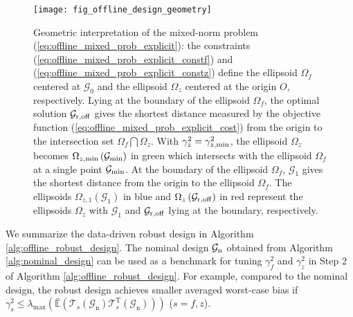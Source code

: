 \documentclass[twocolumn]{autart}
\begin{document}
\begin{figure}[!ht]
\begin{center}
\texttt{[image: fig\_offline\_design\_geometry]}
\caption{Geometric interpretation of the mixed-norm problem (\ref{eq:offline_mixed_prob_explicit}): the constraints (\ref{eq:offline_mixed_prob_explicit_constf}) and (\ref{eq:offline_mixed_prob_explicit_constz}) define the ellipsoid $\Omega_f$ centered at $\mathcal{G}_0$ and the ellipsoid $\Omega_z$ centered at the origin $O$, respectively.
Lying at the boundary of the ellipsoid $\Omega_f$, the optimal solution
$\mathcal{G}_{\rm{r,off}}$ gives the shortest distance measured by the objective function (\ref{eq:offline_mixed_prob_explicit_cost}) from the origin to the intersection set $\Omega_f \bigcap \Omega_z$.
With $\gamma_z^2 = \gamma_{z,\rm{min}}^2$, the ellipsoid $\Omega_z$ becomes $\Omega_{z,\rm{min}} \left( \mathcal{G}_{\rm{min}} \right)$ in green which intersects with the ellipsoid $\Omega_f$ at a single point $\mathcal{G}_{\rm{min}}$.
At the boundary of the ellipsoid $\Omega_f$,
$\mathcal{G}_1$ gives the shortest distance from the origin to the ellipsoid $\Omega_f$.
The ellipsoids $\Omega_{z,1} \left( \mathcal{G}_1 \right)$ in blue and $\Omega_{z} \left( \mathcal{G}_{\rm{r,off}} \right)$ in red represent the ellipsoids $\Omega_z$ with $\mathcal{G}_1$ and $\mathcal{G}_{\rm{r,off}}$ lying at the boundary, respectively.}
\label{fig:geom}
\end{center}
\end{figure}




We summarize the data-driven robust design in Algorithm \ref{alg:offline_robust_design}. The nominal design $\mathcal{G}_{\rm{n}}$ obtained from Algorithm \ref{alg:nominal_design} can be used as a benchmark for tuning $\gamma_f^2$ and $\gamma_z^2$ in Step 2 of Algorithm \ref{alg:offline_robust_design}. For example, compared to the nominal design, the robust design achieves smaller averaged worst-case bias if $\gamma_s^2 \leq \lambda_{\text{max}} \left(\mathbb{\bar E} \left( {\mathcal{T}}_{s} \left( \mathcal{G}_\text{n} \right) {\mathcal{T}}_{s}^\mathrm{T} \left( \mathcal{G}_\text{n} \right) \right)\right)$ ($s=f,z$).
\end{document}
